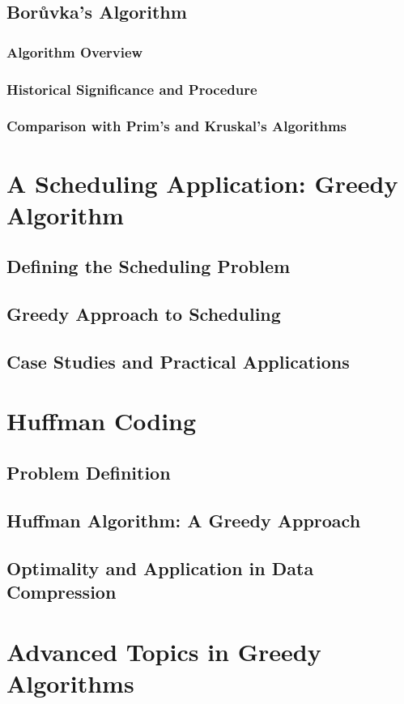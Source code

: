 \documentclass[12pt]{book} %
\begin{document}
\subsection{Borůvka's Algorithm}
\subsubsection{Algorithm Overview}
\subsubsection{Historical Significance and Procedure}
\subsubsection{Comparison with Prim's and Kruskal's Algorithms}

\section{A Scheduling Application: Greedy Algorithm}
\subsection{Defining the Scheduling Problem}
\subsection{Greedy Approach to Scheduling}
\subsection{Case Studies and Practical Applications}

\section{Huffman Coding}
\subsection{Problem Definition}
\subsection{Huffman Algorithm: A Greedy Approach}
\subsection{Optimality and Application in Data Compression}

\section{Advanced Topics in Greedy Algorithms}
\end{document}

